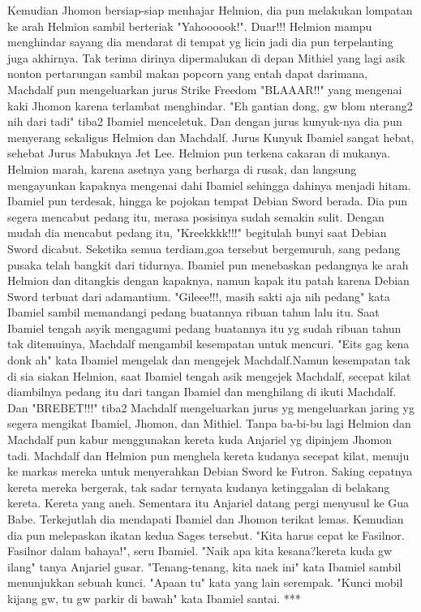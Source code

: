 \documentclass[a4paper,11pt,final]{article}
\begin{document}
Kemudian Jhomon bersiap-siap menhajar Helmion, dia pun melakukan lompatan ke arah Helmion sambil berteriak "Yahoooook!". Duar!!! Helmion mampu menghindar sayang dia mendarat di tempat yg licin jadi dia pun terpelanting juga akhirnya.
Tak terima dirinya dipermalukan di depan Mithiel yang lagi asik nonton pertarungan sambil makan popcorn yang entah dapat darimana, Machdalf pun mengeluarkan jurus Strike Freedom "BLAAAR!!" yang mengenai kaki Jhomon karena terlambat menghindar.
"Eh gantian dong, gw blom nterang2 nih dari tadi" tiba2 Ibamiel menceletuk. Dan dengan jurus kunyuk-nya dia pun menyerang sekaligus Helmion dan Machdalf.
Jurus Kunyuk Ibamiel sangat hebat, sehebat Jurus Mabuknya Jet Lee. Helmion pun terkena cakaran di mukanya. Helmion marah, karena asetnya yang berharga di rusak, dan langsung mengayunkan kapaknya mengenai dahi Ibamiel sehingga dahinya menjadi hitam.
Ibamiel pun terdesak, hingga ke pojokan tempat Debian Sword berada. Dia pun segera mencabut pedang itu, merasa posisinya sudah semakin sulit. Dengan mudah dia mencabut pedang itu, "Kreekkkk!!!" begitulah bunyi saat Debian Sword dicabut.
Seketika semua terdiam,goa tersebut bergemuruh, sang pedang pusaka telah bangkit dari tidurnya. Ibamiel pun menebaskan pedangnya ke arah Helmion dan ditangkis dengan kapaknya, namun kapak itu patah karena Debian Sword terbuat dari adamantium.
"Gileee!!!, masih sakti aja nih pedang" kata Ibamiel sambil memandangi pedang buatannya ribuan tahun lalu itu. Saat Ibamiel tengah asyik mengagumi pedang buatannya itu yg sudah ribuan tahun tak ditemuinya, Machdalf mengambil kesempatan untuk mencuri.
"Eits gag kena donk ah" kata Ibamiel mengelak dan mengejek Machdalf.Namun kesempatan tak di sia siakan Helmion, saat Ibamiel tengah asik mengejek Machdalf, secepat kilat diambilnya pedang itu dari tangan Ibamiel dan menghilang di ikuti Machdalf.
Dan "BREBET!!!" tiba2 Machdalf mengeluarkan jurus yg mengeluarkan jaring yg segera mengikat Ibamiel, Jhomon, dan Mithiel. Tanpa ba-bi-bu lagi Helmion dan Machdalf pun kabur menggunakan kereta kuda Anjariel yg dipinjem Jhomon tadi.
Machdalf dan Helmion pun menghela kereta kudanya secepat kilat, menuju ke markas mereka untuk menyerahkan Debian Sword ke Futron. Saking cepatnya kereta mereka bergerak, tak sadar ternyata kudanya ketinggalan di belakang kereta. Kereta yang aneh.
Sementara itu Anjariel datang pergi menyusul ke Gua Babe. Terkejutlah dia mendapati Ibamiel dan Jhomon terikat lemas. Kemudian dia pun melepaskan ikatan kedua Sages tersebut. "Kita harus cepat ke Fasilnor. Fasilnor dalam bahaya!", seru Ibamiel.
"Naik apa kita kesana?kereta kuda gw ilang" tanya Anjariel gusar. "Tenang-tenang, kita naek ini" kata Ibamiel sambil menunjukkan sebuah kunci. "Apaan tu" kata yang lain serempak. "Kunci mobil kijang gw, tu gw parkir di bawah" kata Ibamiel santai.
***
\end{document}
